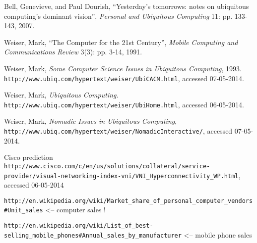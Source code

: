 \begin{thebibliography}{9}

        Bell, Genevieve, and Paul Dourish,
        ``Yesterday's tomorrows: notes on ubiquitous computing's dominant vision'',
        \emph{Personal and Ubiquitous Computing} 11: pp. 133-143,
        2007.
        
        Weiser, Mark,
        ``The Computer for the 21st Century'',
        \emph{Mobile Computing and Communications Review} 3(3): pp. 3-14,
        1991.
		
		Weiser, Mark,
		\emph{Some Computer Science Issues in Ubiquitous Computing},
		1993.
		\verb+http://www.ubiq.com/hypertext/weiser/UbiCACM.html+, accessed 07-05-2014.
        
        Weiser, Mark,
        \emph{Ubiquitous Computing}.
        \verb+http://www.ubiq.com/hypertext/weiser/UbiHome.html+, accessed 06-05-2014.
        
		Weiser, Mark,
		\emph{Nomadic Issues in Ubiquitous Computing},
		\verb+http://www.ubiq.com/hypertext/weiser/NomadicInteractive/+, accessed 07-05-2014.
		
        Cisco prediction
        \verb+http://www.cisco.com/c/en/us/solutions/collateral/service-provider/visual-networking-index-vni/VNI_Hyperconnectivity_WP.html+, accessed 06-05-2014
        
    \verb+http://en.wikipedia.org/wiki/Market_share_of_personal_computer_vendors#Unit_sales+ <-- computer sales ! 

    \verb+http://en.wikipedia.org/wiki/List_of_best-selling_mobile_phones#Annual_sales_by_manufacturer+ <-- mobile phone sales
 
\end{thebibliography}